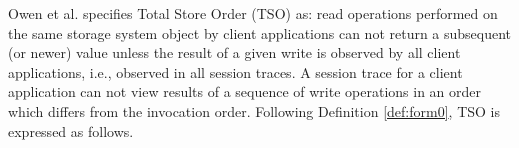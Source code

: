 \documentclass{sig-alternate-05-2015}
\begin{document}
 \par Owen et al. \cite{Owens:2009:BXM:1616077.1616107} specifies Total Store Order (TSO) as: read operations performed on the same storage system object by
  client applications can not return a subsequent (or newer) value unless the result of a given write is observed by all client applications, i.e., observed in all  session traces.
 A session trace for a client application can not view results of a sequence of write operations in an
 order which differs from the invocation order. %
  Following Definition
   \ref{def:form0}, %
  TSO is expressed as follows.
\end{document}
